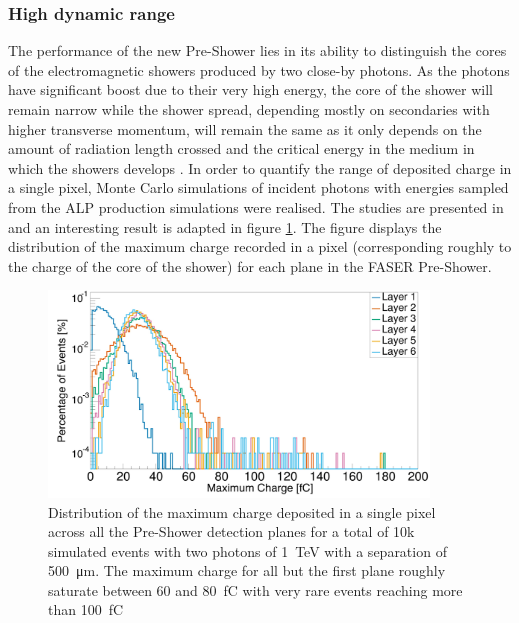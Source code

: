 		\subsubsection{High dynamic range}
		The performance of the new Pre-Shower lies in its ability to distinguish the cores of the electromagnetic showers produced by two close-by photons. As the photons have significant boost due to their very high energy, the core of the shower will remain narrow while the shower spread, depending mostly on secondaries with higher transverse momentum, will remain the same as it only depends on the amount of radiation length crossed and the critical energy in the medium in which the showers develops \cite{PDG}. In order to quantify the range of deposited charge in a single pixel, Monte Carlo simulations of incident photons with energies sampled from the ALP production simulations were realised. The studies are presented in \cite{Kotitsa_thesis} and an interesting result is adapted in figure \ref{im:charge_per_plane_FASER}. The figure displays the distribution of the maximum charge recorded in a pixel (corresponding roughly to the charge of the core of the shower) for each plane in the FASER Pre-Shower.
		
		\begin{figure}[h]
			\centering
			\includegraphics[width=0.9\textwidth]{files/charge_per_plane_FASER}
			\caption{Distribution of the maximum charge deposited in a single pixel across all the Pre-Shower detection planes for a total of 10k simulated events with two photons of \SI{1}{\tera\electronvolt} with a separation of \SI{500}{\micro\meter}. The maximum charge for all but the first plane roughly saturate between 60 and \SI{80}{\femto\coulomb} with very rare events reaching more than \SI{100}{\femto\coulomb}}
			\label{im:charge_per_plane_FASER}
		\end{figure}
		
